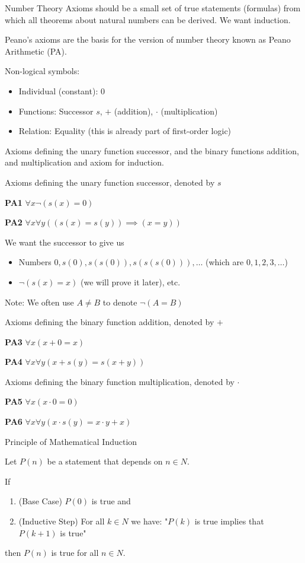 \documentclass{article}
\begin{document}
Number Theory Axioms should be a small set of true statements (formulas) from which all theorems about natural numbers can be derived. We want induction.

Peano's axioms are the basis for the version of number theory known as Peano Arithmetic (PA). 

Non-logical symbols:
\begin{itemize}
    \item Individual (constant): $0$
    \item Functions: Successor $s$, $+$ (addition), $\cdot$ (multiplication)
    \item Relation: Equality (this is already part of first-order logic)
\end{itemize}

Axioms defining the unary function successor, and the binary functions addition, and multiplication and axiom for induction.

Axioms defining the unary function successor, denoted by $s$

\textbf{PA1} $\forall x \neg (s(x) = 0)$

\textbf{PA2} $\forall x \forall y ((s(x) = s(y)) \implies (x = y))$


We want the successor to give us
\begin{itemize}
    \item Numbers $0, s(0), s(s(0)), s(s(s(0))), \ldots$ (which are $0, 1, 2, 3, \ldots$)
    \item $\neg (s(x) = x)$ (we will prove it later), etc.
\end{itemize}

Note: We often use $A \ne B$ to denote $\neg (A = B)$

Axioms defining the binary function addition, denoted by $+$

\textbf{PA3} $\forall x (x + 0 = x)$

\textbf{PA4} $\forall x \forall y (x + s(y) = s(x + y))$

Axioms defining the binary function multiplication, denoted by $\cdot$

\textbf{PA5} $\forall x (x \cdot 0 = 0)$

\textbf{PA6} $\forall x \forall y (x \cdot s(y) = x \cdot y + x)$

Principle of Mathematical Induction

Let $P(n)$ be a statement that depends on $n \in N$.

If
\begin{enumerate}
    \item (Base Case) $P(0)$ is true and
    \item (Inductive Step) For all $k \in N$ we have: "$P(k)$ is true implies that $P(k+1)$ is true"
\end{enumerate}
then $P(n)$ is true for all $n \in N$.
\end{document}
